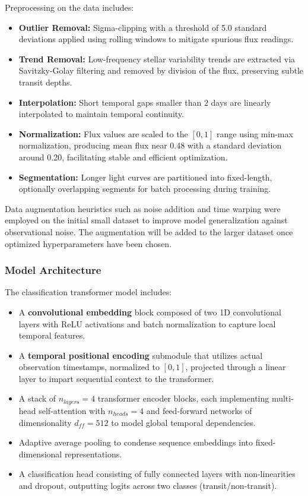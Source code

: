 \documentclass[letterpaper]{article} %
\begin{document}
Preprocessing on the data includes:

\begin{itemize}
    \item \textbf{Outlier Removal:} Sigma-clipping with a threshold of 5.0 standard deviations applied using rolling windows to mitigate spurious flux readings.
    \item \textbf{Trend Removal:} Low-frequency stellar variability trends are extracted via Savitzky-Golay filtering and removed by division of the flux, preserving subtle transit depths.
    \item \textbf{Interpolation:} Short temporal gaps smaller than 2 days are linearly interpolated to maintain temporal continuity.
    \item \textbf{Normalization:} Flux values are scaled to the \([0,1]\) range using min-max normalization, producing mean flux near 0.48 with a standard deviation around 0.20, facilitating stable and efficient optimization.
    \item \textbf{Segmentation:} Longer light curves are partitioned into fixed-length, optionally overlapping segments for batch processing during training.
\end{itemize}

Data augmentation heuristics such as noise addition and time warping were employed on the initial small dataset to improve model generalization against observational noise. The augmentation will be added to the larger dataset once optimized hyperparameters have been chosen.

\subsubsection*{Model Architecture}

The classification transformer model includes:

\begin{itemize}
    \item A \textbf{convolutional embedding} block composed of two 1D convolutional layers with ReLU activations and batch normalization to capture local temporal features.
    \item A \textbf{temporal positional encoding} submodule that utilizes actual observation timestamps, normalized to \([0,1]\), projected through a linear layer to impart sequential context to the transformer.
    \item A stack of \(n_{layers}=4\) transformer encoder blocks, each implementing multi-head self-attention with \(n_{heads}=4\) and feed-forward networks of dimensionality \(d_{ff}=512\) to model global temporal dependencies.
    \item Adaptive average pooling to condense sequence embeddings into fixed-dimensional representations.
    \item A classification head consisting of fully connected layers with non-linearities and dropout, outputting logits across two classes (transit/non-transit).
\end{itemize}
\end{document}
